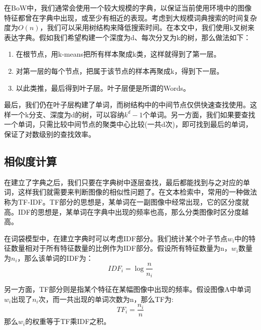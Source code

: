 在BoW中，我们通常会使用一个较大规模的字典，以保证当前使用环境中的图像特征都曾在字典中出现，或至少有相近的表现。考虑到大规模词典搜索的时间复杂度为$O(n)$，我们可以采用树结构来降低搜索时间。在本文中，我们使用k叉树来表达字典。假如我们希望构建一个深度为d、每次分叉为k的树，那么做法如下：
\begin{enumerate}
\item 在根节点，用k-means把所有样本聚成k类，这样就得到了第一层。
\item 对第一层的每个节点，把属于该节点的样本再聚成k，得到下一层。
\item 以此类推，最后得到叶子层。叶子层便是所谓的Words。
\end{enumerate}\par
最后，我们仍在叶子层构建了单词，而树结构中的中间节点仅供快速查找使用。这样一个k分支、深度为d的树，可以容纳$k^{d}-1$个单词。另一方面，我们如果要查找一个单词，只需比较中间节点的聚类中心比较(一共d次)，即可找到最后的单词，保证了对数级别的查找效率。
\subsection{相似度计算}
在建立了字典之后，我们只要在字典树中逐层查找，最后都能找到与之对应的单词，这样我们就需要来判断图像的相似性问题了。在文本检索中，常用的一种做法称为TF-IDF。TF部分的思想是，某单词在一副图像中经常出现，它的区分度就高。IDF的思想是，某单词在字典中出现的频率也高，那么分类图像时区分度越高。\par
在词袋模型中，在建立字典时可以考虑IDF部分。我们统计某个叶子节点$w_{i}$中的特征数量相对于所有特征数量的比例作为IDF部分。假设所有特征数量为n，$w_{i}$数量为$n_{i}$，那么该单词的IDF为：
\begin{equation}
IDF_{i}=\log \frac{n}{n_{i}}
\end{equation}\par
另一方面，TF部分则是指某个特征在某幅图像中出现的频率。假设图像A中单词$w_{i}$出现了$n_{i}$次，而一共出现的单词次数为n，那么TF为:
\begin{equation}
T F_{i}=\frac{n_{i}}{n}
\end{equation}
那么$w_{i}$的权重等于TF乘IDF之积。
